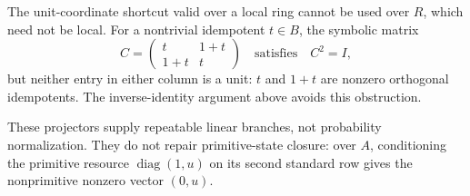 \documentclass[11pt]{article}
\begin{document}
The unit-coordinate shortcut valid over a local ring cannot be used over $R$, which need not be local. For a nontrivial idempotent $t\in B$, the symbolic matrix
\[
C=\begin{pmatrix}t&1+t\\1+t&t\end{pmatrix}
\quad\text{satisfies}\quad C^2=I,
\]
but neither entry in either column is a unit: $t$ and $1+t$ are nonzero orthogonal idempotents. The inverse-identity argument above avoids this obstruction.

These projectors supply repeatable linear branches, not probability normalization. They do not repair primitive-state closure: over $A$, conditioning the primitive resource $\operatorname{diag}(1,u)$ on its second standard row gives the nonprimitive nonzero vector $(0,u)$.
\end{document}
